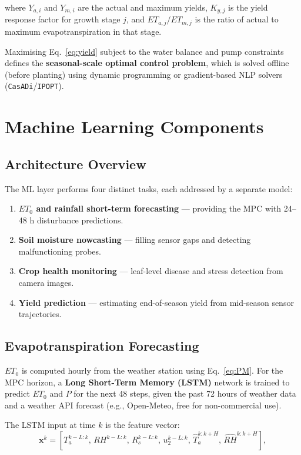 \documentclass[12pt, a4paper]{report}
\begin{document}
where $Y_{a,i}$ and $Y_{m,i}$ are the actual and maximum yields, $K_{y,j}$ is the yield response factor for growth stage $j$, and $ET_{a,j}/ET_{m,j}$ is the ratio of actual to maximum evapotranspiration in that stage.

Maximising Eq.~\eqref{eq:yield} subject to the water balance and pump constraints defines the \textbf{seasonal-scale optimal control problem}, which is solved offline (before planting) using dynamic programming or gradient-based NLP solvers (\texttt{CasADi}/\texttt{IPOPT}).

\chapter{Machine Learning Components}

\section{Architecture Overview}

The ML layer performs four distinct tasks, each addressed by a separate model:

\begin{enumerate}[leftmargin=2em]
  \item \textbf{$ET_0$ and rainfall short-term forecasting} — providing the MPC with 24–48 h disturbance predictions.
  \item \textbf{Soil moisture nowcasting} — filling sensor gaps and detecting malfunctioning probes.
  \item \textbf{Crop health monitoring} — leaf-level disease and stress detection from camera images.
  \item \textbf{Yield prediction} — estimating end-of-season yield from mid-season sensor trajectories.
\end{enumerate}

\section{Evapotranspiration Forecasting}

$ET_0$ is computed hourly from the weather station using Eq.~\eqref{eq:PM}. For the MPC horizon, a \textbf{Long Short-Term Memory (LSTM)} network is trained to predict $ET_0$ and $P$ for the next 48 steps, given the past 72 hours of weather data and a weather API forecast (e.g., Open-Meteo, free for non-commercial use).

The LSTM input at time $k$ is the feature vector:
\begin{equation}
  \mathbf{x}^k = \left[T_a^{k-L:k},\, RH^{k-L:k},\, R_s^{k-L:k},\, u_2^{k-L:k},\, \widehat{T}_a^{k:k+H},\, \widehat{RH}^{k:k+H}\right],
\end{equation}
\end{document}
